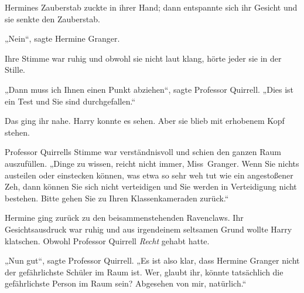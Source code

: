 Hermines Zauberstab zuckte in ihrer Hand; dann entspannte sich ihr Gesicht und sie senkte den Zauberstab.

„Nein“, sagte Hermine Granger.

Ihre Stimme war ruhig und obwohl sie nicht laut klang, hörte jeder sie in der Stille.

„Dann muss ich Ihnen einen Punkt abziehen“, sagte Professor Quirrell. „Dies ist ein Test und Sie sind durchgefallen.“

Das ging ihr nahe. Harry konnte es sehen. Aber sie blieb mit erhobenem Kopf stehen.

Professor Quirrells Stimme war verständnisvoll und schien den ganzen Raum auszufüllen. „Dinge zu wissen, reicht nicht immer, Miss~Granger. Wenn Sie nichts austeilen oder einstecken können, was etwa so sehr weh tut wie ein angestoßener Zeh, dann können Sie sich nicht verteidigen und Sie werden in Verteidigung nicht bestehen. Bitte gehen Sie zu Ihren Klassenkameraden zurück.“

Hermine ging zurück zu den beisammenstehenden Ravenclaws. Ihr Gesichtsausdruck war ruhig und aus irgendeinem seltsamen Grund wollte Harry klatschen. Obwohl Professor Quirrell \emph{Recht} gehabt hatte.

„Nun gut“, sagte Professor Quirrell. „Es ist also klar, dass Hermine Granger nicht der gefährlichste Schüler im Raum ist. Wer, glaubt ihr, könnte tatsächlich die gefährlichste Person im Raum sein? Abgesehen von mir, natürlich.“

